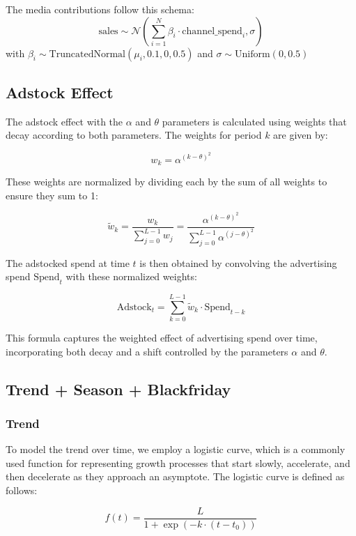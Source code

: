 \documentclass{article}
\begin{document}
The media contributions follow this schema:
\[
    \text{sales} \sim \mathcal{N}\left(\sum_{i=1}^{N} \beta_i \cdot \mathrm{channel\_spend}_i, \sigma\right)
\]
with $\beta_i \sim \text{TruncatedNormal}(\mu_i, 0.1, 0, 0.5)$ and $\sigma \sim \text{Uniform}(0, 0.5)$

\subsection{Adstock Effect}

\noindent
The adstock effect with the \(\alpha\) and \(\theta\) parameters is calculated using weights that decay according to both parameters. The weights for period \( k \) are given by:

\[
w_k = \alpha^{(k - \theta)^2}
\]

These weights are normalized by dividing each by the sum of all weights to ensure they sum to 1:

\[
\tilde{w}_k = \frac{w_k}{\sum_{j=0}^{L-1} w_j} = \frac{\alpha^{(k - \theta)^2}}{\sum_{j=0}^{L-1} \alpha^{(j - \theta)^2}}
\]

The adstocked spend at time \( t \) is then obtained by convolving the advertising spend \( \text{Spend}_t \) with these normalized weights:

\[
\mathrm{Adstock}_t = \sum_{k=0}^{L-1} \tilde{w}_k \cdot \text{Spend}_{t-k}
\]

This formula captures the weighted effect of advertising spend over time, incorporating both decay and a shift controlled by the parameters \( \alpha \) and \(\theta\).

\subsection{Trend + Season + Blackfriday}

\subsubsection{Trend}

\noindent
To model the trend over time, we employ a logistic curve, which is a commonly used function for representing growth processes that start slowly, accelerate, and then decelerate as they approach an asymptote. The logistic curve is defined as follows:

\[
f(t) = \frac{L}{1 + \exp(-k \cdot (t - t_0))}
\]

\end{document}
